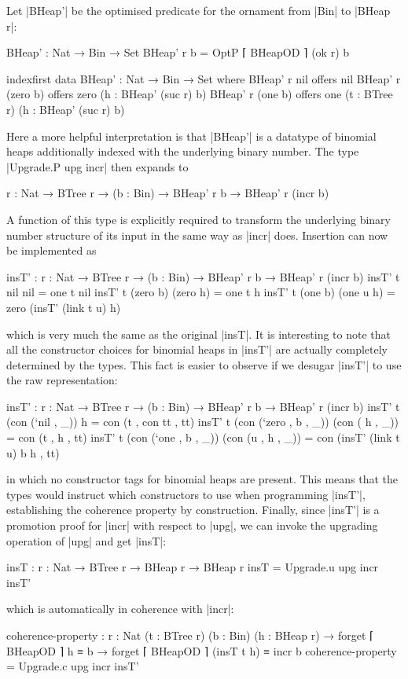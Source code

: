 Let |BHeap'| be the optimised predicate for the ornament from |Bin| to |BHeap r|:
\begin{code}
BHeap' : Nat → Bin → Set
BHeap' r b = OptP ⌈ BHeapOD ⌉ (ok r) b

indexfirst data BHeap' : Nat → Bin → Set where
  BHeap' r nil        offers  nil
  BHeap' r (zero  b)  offers  zero  (h : BHeap' (suc r) b)
  BHeap' r (one   b)  offers  one   (t : BTree r) (h : BHeap' (suc r) b)
\end{code}
Here a more helpful interpretation is that |BHeap'| is a datatype of binomial heaps additionally indexed with the underlying binary number.
The type |Upgrade.P upg incr| then expands to
\begin{code}
{r : Nat} → BTree r → (b : Bin) → BHeap' r b → BHeap' r (incr b)
\end{code}
A function of this type is explicitly required to transform the underlying binary number structure of its input in the same way as |incr| does.
Insertion can now be implemented as
\begin{code}
insT' : {r : Nat} → BTree r → (b : Bin) → BHeap' r b → BHeap' r (incr b)
insT' t nil        nil         = one t nil
insT' t (zero  b)  (zero   h)  = one t h
insT' t (one   b)  (one u  h)  = zero (insT' (link t u) h)
\end{code}
which is very much the same as the original |insT|.
It is interesting to note that all the constructor choices for binomial heaps in |insT'| are actually completely determined by the types.
This fact is easier to observe if we desugar |insT'| to use the raw representation:
\begin{code}
insT' : {r : Nat} → BTree r → (b : Bin) → BHeap' r b → BHeap' r (incr b)
insT' t (con (`nil   ,      _))  h                   = con (t , con tt , tt)
insT' t (con (`zero  , b ,  _))  (con (     h , _))  = con (t , h , tt)
insT' t (con (`one   , b ,  _))  (con (u ,  h , _))  = con (insT' (link t u) b h , tt)
\end{code}
in which no constructor tags for binomial heaps are present.
This means that the types would instruct which constructors to use when programming |insT'|, establishing the coherence property by construction.
Finally, since |insT'| is a promotion proof for |incr| with respect to |upg|, we can invoke the upgrading operation of |upg| and get |insT|:
\begin{code}
insT : {r : Nat} → BTree r → BHeap r → BHeap r
insT = Upgrade.u upg incr insT'
\end{code}
which is automatically in coherence with |incr|:
\begin{code}
coherence-property :
  {r : Nat} (t : BTree r) (b : Bin) (h : BHeap r) →
  forget ⌈ BHeapOD ⌉ h ≡ b → forget ⌈ BHeapOD ⌉ (insT t h) ≡ incr b
coherence-property = Upgrade.c upg incr insT'
\end{code}

